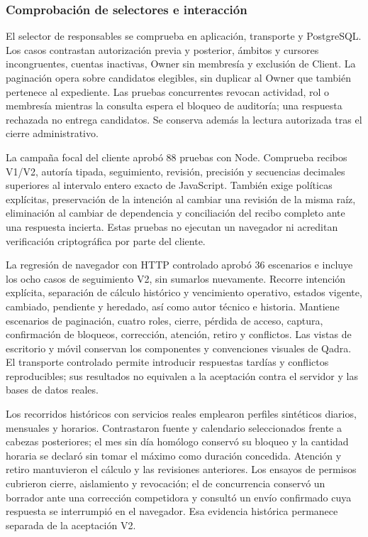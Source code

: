 \subsubsection{Comprobación de selectores e interacción}

El selector de responsables se comprueba en aplicación, transporte y PostgreSQL. Los casos contrastan autorización previa y posterior, ámbitos y cursores incongruentes, cuentas inactivas, Owner sin membresía y exclusión de Client. La paginación opera sobre candidatos elegibles, sin duplicar al Owner que también pertenece al expediente. Las pruebas concurrentes revocan actividad, rol o membresía mientras la consulta espera el bloqueo de auditoría; una respuesta rechazada no entrega candidatos. Se conserva además la lectura autorizada tras el cierre administrativo.

La campaña focal del cliente aprobó 88 pruebas con Node. Comprueba recibos V1/V2, autoría tipada, seguimiento, revisión, precisión y secuencias decimales superiores al intervalo entero exacto de JavaScript. También exige políticas explícitas, preservación de la intención al cambiar una revisión de la misma raíz, eliminación al cambiar de dependencia y conciliación del recibo completo ante una respuesta incierta. Estas pruebas no ejecutan un navegador ni acreditan verificación criptográfica por parte del cliente.

La regresión de navegador con HTTP controlado aprobó 36 escenarios e incluye los ocho casos de seguimiento V2, sin sumarlos nuevamente. Recorre intención explícita, separación de cálculo histórico y vencimiento operativo, estados vigente, cambiado, pendiente y heredado, así como autor técnico e historia. Mantiene escenarios de paginación, cuatro roles, cierre, pérdida de acceso, captura, confirmación de bloqueos, corrección, atención, retiro y conflictos. Las vistas de escritorio y móvil conservan los componentes y convenciones visuales de Qadra. El transporte controlado permite introducir respuestas tardías y conflictos reproducibles; sus resultados no equivalen a la aceptación contra el servidor y las bases de datos reales.

Los recorridos históricos con servicios reales emplearon perfiles sintéticos diarios, mensuales y horarios. Contrastaron fuente y calendario seleccionados frente a cabezas posteriores; el mes sin día homólogo conservó su bloqueo y la cantidad horaria se declaró sin tomar el máximo como duración concedida. Atención y retiro mantuvieron el cálculo y las revisiones anteriores. Los ensayos de permisos cubrieron cierre, aislamiento y revocación; el de concurrencia conservó un borrador ante una corrección competidora y consultó un envío confirmado cuya respuesta se interrumpió en el navegador. Esa evidencia histórica permanece separada de la aceptación V2.

